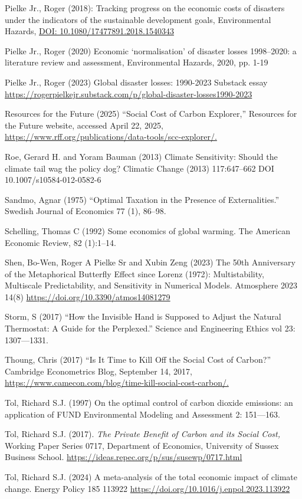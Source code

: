 \documentclass[12pt,paper=a4,DIV=12,parskip=never,chapterprefix=false,headings=standardclasses]{scrreprt}
\begin{document}
Pielke Jr., Roger (2018): Tracking progress on the economic costs of disasters under the indicators of the sustainable development goals, Environmental Hazards, \url{DOI: 10.1080/17477891.2018.1540343}

Pielke Jr., Roger (2020) Economic ‘normalisation’ of disaster losses 1998–2020: a literature review and assessment, Environmental Hazards, 2020, pp. 1-19

Pielke Jr., Roger (2023) Global disaster losses: 1990-2023 Substack essay
\url{https://rogerpielkejr.substack.com/p/global-disaster-losses1990-2023}

Resources for the Future (2025) “Social Cost of Carbon Explorer,” Resources for the Future website,
accessed April 22, 2025, \url{https://www.rff.org/publications/data-tools/scc-explorer/.}

Roe, Gerard H. and Yoram Bauman (2013) Climate Sensitivity: Should the climate tail wag the policy
dog? Climatic Change (2013) 117:647–662 DOI 10.1007/s10584-012-0582-6

Sandmo, Agnar (1975) “Optimal Taxation in the Presence of Externalities.” Swedish Journal of Economics
77 (1), 86–98.

Schelling, Thomas C (1992) Some economics of global warming. The American Economic Review, 82
(1):1–14.

Shen, Bo-Wen, Roger A Pielke Sr and Xubin Zeng (2023) The 50th Anniversary of the Metaphorical
Butterfly Effect since Lorenz (1972): Multistability, Multiscale Predictability, and Sensitivity in
Numerical Models. Atmosphere 2023 14(8) \url{https://doi.org/10.3390/atmos14081279}

Storm, S (2017) “How the Invisible Hand is Supposed to Adjust the Natural Thermostat: A Guide for the Perplexed.” Science and Engineering Ethics vol 23: 1307—1331.

Thoung, Chris (2017) “Is It Time to Kill Off the Social Cost of Carbon?” Cambridge Econometrics Blog,
September 14, 2017, \url{https://www.camecon.com/blog/time-kill-social-cost-carbon/.}

Tol, Richard S.J. (1997) On the optimal control of carbon dioxide emissions: an application of FUND
Environmental Modeling and Assessment 2: 151—163.

Tol, Richard S.J. (2017). \emph{The Private Benefit of Carbon and its Social Cost,} Working Paper Series
0717, Department of Economics, University of Sussex Business School.
\url{https://ideas.repec.org/p/sus/susewp/0717.html}

Tol, Richard S.J. (2024) A meta-analysis of the total economic impact of climate change. Energy Policy
185 113922 \url{https://doi.org/10.1016/j.enpol.2023.113922}
\end{document}
